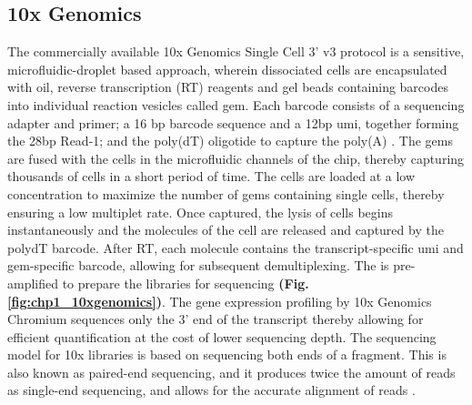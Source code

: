 \subsection{10x Genomics}
\label{sec:scrna_10x}
\par The commercially available 10x Genomics Single Cell 3’ v3 protocol is a sensitive, microfluidic-droplet based approach, wherein dissociated cells are encapsulated with oil, reverse transcription (RT) reagents and gel beads containing barcodes into individual reaction vesicles called \gls{gem}. Each barcode consists of a sequencing adapter and primer; a 16 \gls{bp}  barcode sequence and a 12\gls{bp} \gls{umi}, together forming the 28\gls{bp} Read-1; and the poly(dT) oligotide to capture the poly(A) . The \gls{gem}s are fused with the cells in the microfluidic channels of the chip, thereby capturing thousands of cells in a short period of time. The cells are loaded at a low concentration to maximize the number of \gls{gem}s containing single cells, thereby ensuring a low multiplet rate. Once captured, the lysis of cells begins instantaneously and the  molecules of the cell are released and captured by the polydT barcode. After RT, each  molecule contains the transcript-specific \gls{umi} and \gls{gem}-specific barcode, allowing for subsequent demultiplexing. The  is pre-amplified to prepare the libraries for sequencing \textbf{(Fig. \ref{fig:chp1_10xgenomics})}. The gene expression profiling by 10x Genomics Chromium sequences only the 3’ end of the transcript thereby allowing for efficient  quantification at the cost of lower sequencing depth. The sequencing model for 10x libraries is based on sequencing both ends of a fragment. This is also known as paired-end sequencing, and it produces twice the amount of reads as single-end sequencing, and allows for the accurate alignment of reads \textbf{\cite{danielski_guidance_2023, noauthor_paired-end_nodate}}.

